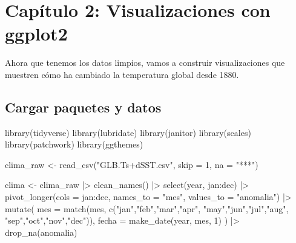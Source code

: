 \documentclass[
  letterpaper,
  DIV=11,
  numbers=noendperiod]{scrreprt}
\newenvironment{Shaded}{\begin{snugshade}}{\end{snugshade}}
\newcommand{\AttributeTok}[1]{\textcolor[rgb]{0.40,0.45,0.13}{#1}}
\newcommand{\DecValTok}[1]{\textcolor[rgb]{0.68,0.00,0.00}{#1}}
\newcommand{\FunctionTok}[1]{\textcolor[rgb]{0.28,0.35,0.67}{#1}}
\newcommand{\NormalTok}[1]{\textcolor[rgb]{0.00,0.23,0.31}{#1}}
\newcommand{\OtherTok}[1]{\textcolor[rgb]{0.00,0.23,0.31}{#1}}
\newcommand{\SpecialCharTok}[1]{\textcolor[rgb]{0.37,0.37,0.37}{#1}}
\newcommand{\StringTok}[1]{\textcolor[rgb]{0.13,0.47,0.30}{#1}}
\begin{document}

\chapter{Capítulo 2: Visualizaciones con
ggplot2}\label{capuxedtulo-2-visualizaciones-con-ggplot2}

Ahora que tenemos los datos limpios, vamos a construir visualizaciones
que muestren cómo ha cambiado la temperatura global desde 1880.

\section{Cargar paquetes y datos}\label{cargar-paquetes-y-datos}

\begin{Shaded}
\begin{Highlighting}[]
\FunctionTok{library}\NormalTok{(tidyverse)}
\FunctionTok{library}\NormalTok{(lubridate)}
\FunctionTok{library}\NormalTok{(janitor)}
\FunctionTok{library}\NormalTok{(scales)}
\FunctionTok{library}\NormalTok{(patchwork)}
\FunctionTok{library}\NormalTok{(ggthemes)}

\NormalTok{clima\_raw }\OtherTok{\textless{}{-}} \FunctionTok{read\_csv}\NormalTok{(}\StringTok{"GLB.Ts+dSST.csv"}\NormalTok{, }\AttributeTok{skip =} \DecValTok{1}\NormalTok{, }\AttributeTok{na =} \StringTok{"***"}\NormalTok{)}

\NormalTok{clima }\OtherTok{\textless{}{-}}\NormalTok{ clima\_raw }\SpecialCharTok{|\textgreater{}}
  \FunctionTok{clean\_names}\NormalTok{() }\SpecialCharTok{|\textgreater{}}
  \FunctionTok{select}\NormalTok{(year, jan}\SpecialCharTok{:}\NormalTok{dec) }\SpecialCharTok{|\textgreater{}}
  \FunctionTok{pivot\_longer}\NormalTok{(}\AttributeTok{cols =}\NormalTok{ jan}\SpecialCharTok{:}\NormalTok{dec,}
               \AttributeTok{names\_to  =} \StringTok{"mes"}\NormalTok{,}
               \AttributeTok{values\_to =} \StringTok{"anomalia"}\NormalTok{) }\SpecialCharTok{|\textgreater{}}
  \FunctionTok{mutate}\NormalTok{(}
    \AttributeTok{mes   =} \FunctionTok{match}\NormalTok{(mes, }\FunctionTok{c}\NormalTok{(}\StringTok{"jan"}\NormalTok{,}\StringTok{"feb"}\NormalTok{,}\StringTok{"mar"}\NormalTok{,}\StringTok{"apr"}\NormalTok{,}
                         \StringTok{"may"}\NormalTok{,}\StringTok{"jun"}\NormalTok{,}\StringTok{"jul"}\NormalTok{,}\StringTok{"aug"}\NormalTok{,}
                         \StringTok{"sep"}\NormalTok{,}\StringTok{"oct"}\NormalTok{,}\StringTok{"nov"}\NormalTok{,}\StringTok{"dec"}\NormalTok{)),}
    \AttributeTok{fecha =} \FunctionTok{make\_date}\NormalTok{(year, mes, }\DecValTok{1}\NormalTok{)}
\NormalTok{  ) }\SpecialCharTok{|\textgreater{}}
  \FunctionTok{drop\_na}\NormalTok{(anomalia)}
\end{Highlighting}
\end{Shaded}
\end{document}
